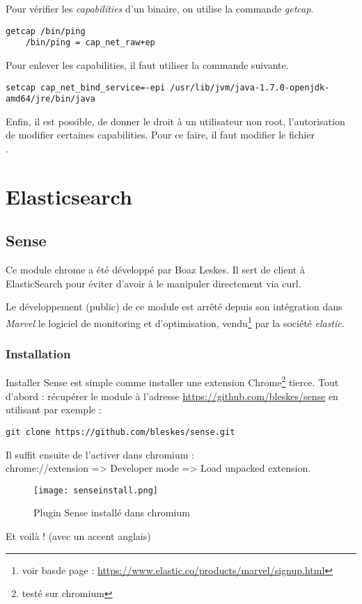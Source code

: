 Pour vérifier les \textit{capabilities} d'un binaire, on utilise la commande 
\emph{getcap}.

\begin{lstlisting}[style=code,label={lst:getcapabilities}]
    getcap /bin/ping
    /bin/ping = cap_net_raw+ep
\end{lstlisting}

Pour enlever les capabilities, il faut utiliser la commande suivante.
\begin{lstlisting}[style=code,label={lst:unsetcapabilities}]
setcap cap_net_bind_service=-epi /usr/lib/jvm/java-1.7.0-openjdk-amd64/jre/bin/java
\end{lstlisting}

Enfin, il est possible, de donner le droit à un utilisateur non root, l'autorisation
de modifier certaines capabilities. Pour ce faire, il faut modifier le fichier \\[1mm]
.

\section{Elasticsearch}
\subsection{Sense}
\label{subsec:elasticsense}
Ce module chrome a été développé par Boaz Leskes. Il sert de client à ElasticSearch
pour éviter d'avoir à le manipuler directement via curl.

Le développement (public) de ce module est arrêté depuis son intégration dans \emph{Marvel} 
le logiciel de monitoring et d'optimisation, vendu\footnote{voir basde page : 
\url{https://www.elastic.co/products/marvel/signup.html}} par la société \emph{elastic}.


\subsubsection{Installation}
Installer Sense est simple comme installer une extension 
Chrome\footnote{testé sur chromium} tierce.
Tout d'abord : récupérer le module à l'adresse \url{https://github.com/bleskes/sense}
en utilisant par exemple : 
\begin{lstlisting}[style=code,label=lst:gitclonesense]
git clone https://github.com/bleskes/sense.git
\end{lstlisting}

Il suffit ensuite de l'activer dans chromium :\\ 
chrome://extension => Developer mode => Load unpacked extension.
\begin{figure}[H]
\center
\texttt{[image: senseinstall.png]}
\label{fig:senseinstall}
\caption{Plugin Sense installé dans chromium}
\end{figure}
Et voilà ! \footnotesize{(avec un accent anglais)}
